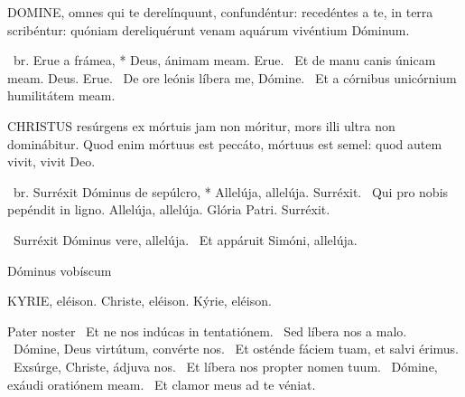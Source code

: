 \lettrine[lines=2]{D}{OMINE}, omnes qui te derelínquunt, confundéntur: recedéntes a te, in terra scribéntur: quóniam dereliquérunt venam aquárum vivéntium Dóminum.


\R\ br. Erue a frámea, * Deus, ánimam meam. Erue. \V\ Et de manu canis únicam meam. Deus. Erue. \V\ De ore leónis líbera me, Dómine. \R\ Et a córnibus unicórnium humilitátem meam.





\lettrine[lines=2]{C}{HRISTUS} resúrgens ex mórtuis jam non móritur, mors illi ultra non dominábitur. Quod enim mórtuus est peccáto, mórtuus est semel: quod autem vivit, vivit Deo.


\R\ br. Surréxit Dóminus de sepúlcro, * Allelúja, allelúja. Surréxit. \V\ Qui pro nobis pepéndit in ligno. Allelúja, allelúja. Glória Patri. Surréxit.

\V\ Surréxit Dóminus vere, allelúja. \R\ Et appáruit Simóni, allelúja.

 Dóminus vobíscum 


KYRIE, eléison. Christe, eléison. Kýrie, eléison.

Pater noster  \V\ Et ne nos indúcas in tentatiónem. \R\ Sed líbera nos a malo. \V\ Dómine, Deus virtútum, convérte nos. \R\ Et osténde fáciem tuam, et salvi érimus. \V\ Exsúrge, Christe, ádjuva nos. \R\ Et líbera nos propter nomen tuum. \V\ Dómine, exáudi oratiónem meam. \R\ Et clamor meus ad te véniat.


